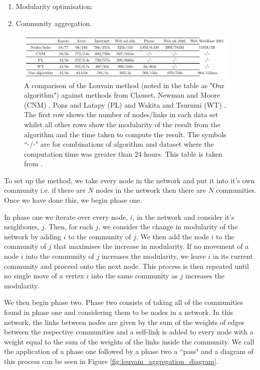 \begin{enumerate}
    \item Modularity optimisation;
    \item Community aggregation.
\end{enumerate}


\begin{figure}
    \begin{center}
        \includegraphics[width=0.95\textwidth]{img/3/comp}
    \end{center}
    \caption{A comparison of the Louvain method (noted in the table as "Our algorithm") against methods from Clauset, Newman and Moore (CNM) \cite{Clauset_2004}, Pons and Latapy (PL) \cite{JGAA-124} and Wakita and Tsurumi (WT) \cite{wakita_tsurumi}. The first row shows the number of nodes/links in each data set whilst all other rows show the modularity of the result from the algorithm and the time taken to compute the result. The symbols ``-/-" are for combinations of algorithm and dataset where the computation time was greater than 24 hours. This table is taken from \cite{Blondel_2008}.}
    \label{fig:louvain_results_comparison}
\end{figure}

\noindent
To set up the method, we take every node in the network and put it into it's own community i.e. if there are $N$ nodes in the network then there are $N$ communities. Once we have done this, we begin phase one. 

In phase one we iterate over every node, $i$, in the network and consider it's neighbours, $j$. Then, for each $j$, we consider the change in modularity of the network by adding $i$ to the community of $j$. We then add the node $i$ to the community of $j$ that maximises the increase in modularity. If no movement of a node $i$ into the community of $j$ increases the modularity, we leave $i$ in its current community and proceed onto the next node.  This process is then repeated until no single move of a vertex $i$ into the same community as $j$ increases the modularity.

We then begin phase two. Phase two consists of taking all of the communities found in phase one and considering them to be nodes in a network. In this network, the links between nodes are given by the sum of the weights of edges between the respective communities and a self-link is added to every node with a weight equal to the sum of the weights of the links inside the community. We call the application of a phase one followed by a phase two a ``pass" and a diagram of this process can be seen in Figure \ref{fig:louvain_aggregation_diagram}.

